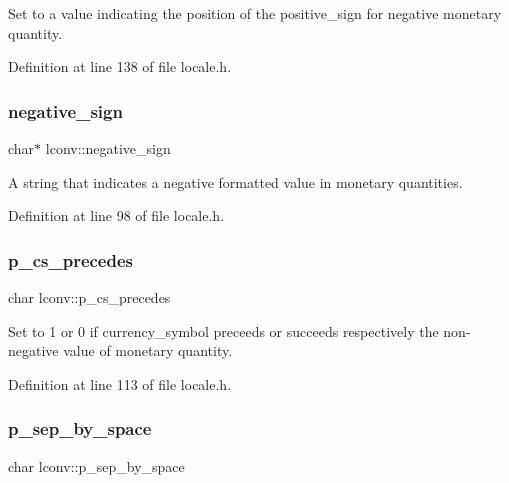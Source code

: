 Set to a value indicating the position of the positive\+\_\+sign for negative monetary quantity. 



Definition at line 138 of file locale.\+h.

\mbox{\label{structlconv_a40dbb1b1d7fdf4926145138f5d8f6f5f}} 
\subsubsection{\texorpdfstring{negative\_sign}{negative\_sign}}
{\footnotesize\ttfamily char$\ast$ lconv\+::negative\+\_\+sign}



A string that indicates a negative formatted value in monetary quantities. 



Definition at line 98 of file locale.\+h.

\mbox{\label{structlconv_af0651922c77fc926609bdd8746784e63}} 
\subsubsection{\texorpdfstring{p\_cs\_precedes}{p\_cs\_precedes}}
{\footnotesize\ttfamily char lconv\+::p\+\_\+cs\+\_\+precedes}



Set to 1 or 0 if currency\+\_\+symbol preceeds or succeeds respectively the non-\/negative value of monetary quantity. 



Definition at line 113 of file locale.\+h.

\mbox{\label{structlconv_a3ae3cb36f4426158e4ab2ea6dc4278ad}} 
\subsubsection{\texorpdfstring{p\_sep\_by\_space}{p\_sep\_by\_space}}
{\footnotesize\ttfamily char lconv\+::p\+\_\+sep\+\_\+by\+\_\+space}



